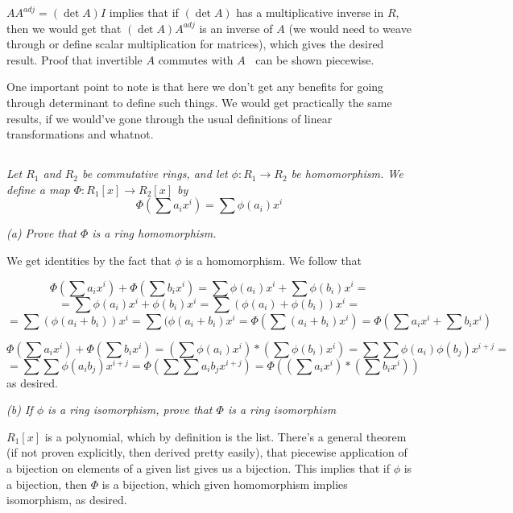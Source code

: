\documentclass[11pt,oneside,titlepage]{book}
\DeclareMathOperator \inv {^{-1}}
\begin{document}
$A A^{adj} = (\det A) I$ implies that if $(\det A)$ has a
multiplicative inverse in $R$, then we would get that $(\det
A)A^{adj}$ is an inverse of $A$ (we would need to weave through or
define scalar multiplication for matrices), which gives the desired
result. Proof that invertible $A$ commutes with $A\inv$ can be shown
piecewise.

One important point to note is that here we don't get any benefits for
going through determinant to define such things. We would get
practically the same results, if we would've gone through the usual
definitions of linear transformations and whatnot.

\subsection{}

\textit{Let $R_1$ and $R_2$ be commutative rings, and let $\phi: R_1
  \to R_2$ be homomorphism. We define a map $\Phi: R_1[x] \to R_2[x]$ by
  $$\Phi(\sum{a_i x^i}) = \sum {\phi(a_i) x^i}$$
}

\textit{(a) Prove that $\Phi$ is a ring homomorphism.}

We get identities by the fact that $\phi$ is a homomorphism. We follow that

$$\Phi(\sum{a_i x^i}) + \Phi(\sum{b_i x^i}) = \sum{\phi(a_i) x^i} + \sum{\phi(b_i) x^i} = $$
$$ =  \sum{\phi(a_i) x^i + \phi(b_i) x^i}= \sum{(\phi(a_i) + \phi(b_i)) x^i} = $$
$$ =  \sum{(\phi(a_i + b_i)) x^i}= \sum{(\phi(a_i + b_i) x^i}= \Phi(\sum{(a_i + b_i) x^i}) =
\Phi(\sum{a_i x^i} + \sum{b_i x^i} )$$

$$ \Phi(\sum{a_i x^i}) + \Phi(\sum{b_i x^i}) =
(\sum{\phi(a_i) x^i}) * ( \sum{\phi(b_i) x^i}) = \sum{\sum{\phi(a_i) \phi(b_j) x^{i + j}}} = $$
$$ = \sum{\sum{\phi(a_i b_j) x^{i + j}}} = \Phi(\sum{\sum{a_i b_j x^{i + j}}}) =
\Phi((\sum{a_i x^i}) * (\sum{b_i x^i}))$$
as desired.

\textit{(b) If $\phi$ is a ring isomorphism, prove that $\Phi$ is a
ring isomorphism}

$R_1[x]$ is a polynomial, which by definition is the list. There's a
general theorem (if not proven explicitly, then derived pretty
easily), that piecewise application of a bijection on elements of a
given list gives us a bijection. This implies that if $\phi$ is a
bijection, then $\Phi$ is a bijection, which given homomorphism
implies isomorphism, as desired.

\subsection{}
\end{document}
